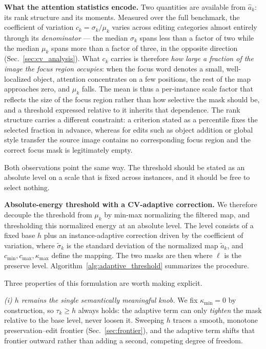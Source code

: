 \noindent\textbf{What the attention statistics encode.}
Two quantities are available from $\hat{a}_k$: its rank structure and its moments.
Measured over the full benchmark, the coefficient of variation
$c_k = \sigma_k/\mu_k$ varies across editing categories almost entirely through
its \emph{denominator} --- the median $\sigma_k$ spans less than a factor of two
while the median $\mu_k$ spans more than a factor of three, in the opposite
direction (Sec.~\ref{sec:cv_analysis}). What $c_k$ carries is therefore
\textit{how large a fraction of the image the focus region occupies}: when the
focus word denotes a small, well-localized object, attention concentrates on a
few positions, the rest of the map approaches zero, and $\mu_k$ falls. The mean
is thus a per-instance scale factor that reflects the size of the focus region
rather than how selective the mask should be, and a threshold expressed relative
to it inherits that dependence. The rank structure carries a different
constraint: a criterion stated as a percentile fixes the selected fraction in
advance, whereas for edits such as object addition or global style transfer the
source image contains no corresponding focus region and the correct focus mask
is legitimately empty.

Both observations point the same way. The threshold should be stated as an
absolute level on a scale that is fixed across instances, and it should be free
to select nothing.

\noindent\textbf{Absolute-energy threshold with a CV-adaptive correction.}
We therefore decouple the threshold from $\mu_k$ by min-max normalizing the filtered map,
\EqNormalize
and thresholding this normalized energy at an absolute level. The level consists of a fixed base $h$ plus an instance-adaptive correction driven by the coefficient of variation,
\EqKappa
\EqTau
where $\tilde{\sigma}_k$ is the standard deviation of the normalized map $\tilde{a}_k$, and $c_{\min}, c_{\max}, \kappa_{\max}$ define the mapping. The two masks are then
\EqMasks
where $\ell$ is the preserve level. Algorithm~\ref{alg:adaptive_threshold} summarizes the procedure.



Three properties of this formulation are worth making explicit.

\textit{(i) $h$ remains the single semantically meaningful knob.} We fix $\kappa_{\min} = 0$ by construction, so $\tau_k \ge h$ always holds: the adaptive term can only \emph{tighten} the mask relative to the base level, never loosen it. Sweeping $h$ traces a smooth, monotone preservation--edit frontier (Sec.~\ref{sec:frontier}), and the adaptive term shifts that frontier outward rather than adding a second, competing degree of freedom.

